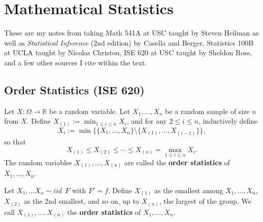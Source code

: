 %
%
%
%
%
%
%
%
%
%
%
%

\section{Mathematical Statistics}

These are my notes from taking Math 541A at USC taught by Steven Heilman as well as \textit{Statistical Inference} (2nd edition) by Casella and Berger, Statistics 100B at UCLA taught by Nicolas Christou, ISE 620 at USC taught by Sheldon Ross, and a few other sources I cite within the text.

\subsection{Order Statistics (ISE 620)}

\begin{definition} Let \(X:\Omega\to\mathbb{R}\) be a random variable.  Let $X_{1},\ldots,X_{n}$ be a random sample of size $n$ from $X$.  Define $X_{(1)}:=\min_{1\leq i\leq n}X_{i}$, and for any $2\leq i\leq n$, inductively define
$$X_{i}:=\min\Big\{\{X_{1},\ldots,X_{n}\}\setminus\{X_{(1)},\ldots,X_{(i-1)}\}\Big\},$$
so that
$$X_{(1)}\leq X_{(2)}\leq\cdots\leq X_{(n)}=\max_{1\leq i\leq n}X_{i}.$$
The random variables $X_{(1)},\ldots,X_{(n)}$ are called the \textbf{order statistics} of $X_{1},\ldots,X_{n}$.


\end{definition}

\begin{definition} Let \(X_1, \ldots X_n \sim iid \ \ F\) with \(F' = f\). Define \(X_{(1)}\) as the smallest among \(X_1, \ldots, X_n\), \(X_{(2)}\) as the 2nd smallest, and so on, up to \(X_{(n)}\), the largest of the group. We call \(X_{(1)}, \ldots, X_{(n)}\) the \textbf{order statistics} of \(X_1, \ldots, X_n\).

\end{definition}

